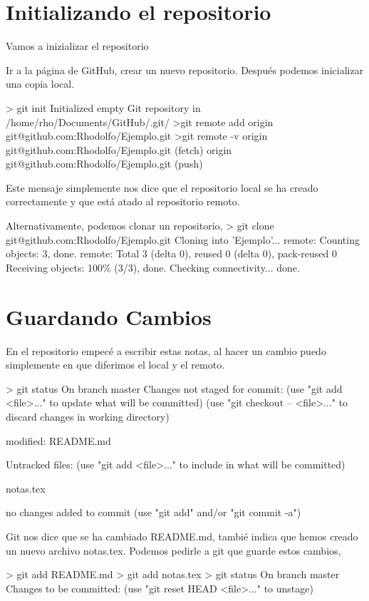 \section{Initializando el repositorio}

Vamos a inizializar el repositorio

Ir a la p\'{a}gina de GitHub, crear un nuevo repositorio.
Despu\'{e}s podemos inicializar una copia local. 

> git init
Initialized empty Git repository in /home/rho/Documents/GitHub/.git/
>git remote add origin git@github.com:Rhodolfo/Ejemplo.git
>git remote -v
origin	git@github.com:Rhodolfo/Ejemplo.git (fetch)
origin	git@github.com:Rhodolfo/Ejemplo.git (push)

Este mensaje simplemente nos dice que el repositorio local se ha creado correctamente
y que est\'{a} atado al repositorio remoto.

Alternativamente, podemos clonar un repositorio,
> git clone git@github.com:Rhodolfo/Ejemplo.git
Cloning into 'Ejemplo'...
remote: Counting objects: 3, done.
remote: Total 3 (delta 0), reused 0 (delta 0), pack-reused 0
Receiving objects: 100\% (3/3), done.
Checking connectivity... done.

\section{Guardando Cambios}

En el repositorio empec\'{e} a escribir estas notas,
al hacer un cambio puedo simplemente en que diferimos el local y el remoto.

> git status
On branch master
Changes not staged for commit:
  (use "git add <file>..." to update what will be committed)
  (use "git checkout -- <file>..." to discard changes in working directory)

	modified:   README.md

Untracked files:
  (use "git add <file>..." to include in what will be committed)

	notas.tex

no changes added to commit (use "git add" and/or "git commit -a")

Git nos dice que se ha cambiado README.md,
tambi\'{e} indica que hemos creado un nuevo archivo notas.tex.
Podemos pedirle a git que guarde estos cambios,

> git add README.md
> git add notas.tex
> git status
On branch master
Changes to be committed:
  (use "git reset HEAD <file>..." to unstage)

